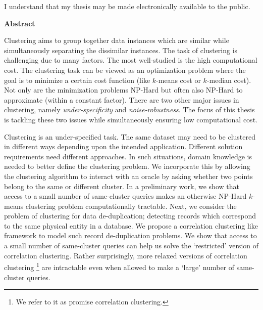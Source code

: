 \documentclass[letterpaper,12pt,titlepage,oneside,final]{book}
\let\origdoublepage\cleardoublepage
\newcommand{\clearemptydoublepage}{%
  \clearpage{\pagestyle{empty}\origdoublepage}}
\let\cleardoublepage\clearemptydoublepage
\begin{document}
  \bigskip
  
  \noindent
I understand that my thesis may be made electronically available to the public.

\cleardoublepage

\begin{center}\textbf{Abstract}\end{center}
Clustering aims to group together data instances which are similar while simultaneously separating the dissimilar instances. The task of clustering is challenging due to many factors. The most well-studied is the high computational cost. The clustering task can be viewed as an optimization problem where the goal is to minimize a certain cost function (like $k$-means cost or $k$-median cost). Not only are the minimization problems NP-Hard but often also NP-Hard to approximate (within a constant factor). There are two other major issues in clustering, namely \emph{under-specificity} and \emph{noise-robustness}. The focus of this thesis is tackling these two issues while simultaneously ensuring low computational cost. 

Clustering is an under-specified task. The same dataset may need to be clustered in different ways depending upon the intended application. Different solution requirements need different approaches. In such situations, domain knowledge is needed to better define the clustering problem. We incorporate this by allowing the clustering algorithm to interact with an oracle by asking whether two points belong to the same or different cluster. In a preliminary work, we show that access to a small number of same-cluster queries makes an otherwise NP-Hard $k$-means clustering problem computationally tractable. Next, we consider the problem of clustering for data de-duplication; detecting records which correspond to the same physical entity in a database. We propose a correlation clustering like framework to model such record de-duplication problems. We show that access to a small number of same-cluster queries can help us solve the `restricted' version of correlation clustering. Rather surprisingly, more relaxed versions of correlation clustering \footnote{We refer to it as promise correlation clustering.} are intractable even when allowed to make a `large' number of same-cluster queries. 
\end{document}
